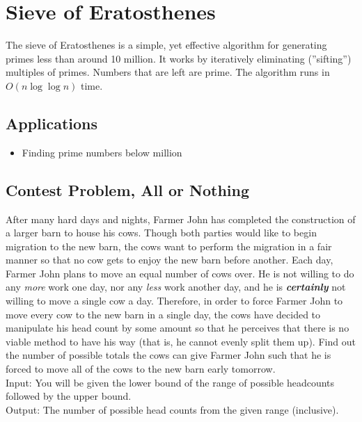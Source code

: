 \section{Sieve of Eratosthenes}
The sieve of Eratosthenes is a simple, yet effective algorithm for generating primes less than around 10 million.
It works by iteratively eliminating (''sifting'') multiples of primes.
Numbers that are left are prime.
The algorithm runs in $O(n\log\log n)$ time.

\subsection{Applications}
\begin{itemize}
	\item	Finding prime numbers below  million
\end{itemize}

\subsection{Contest Problem, All or Nothing}
After many hard days and nights, Farmer John has completed the construction of a larger barn to house his cows.
Though both parties would like to begin migration to the new barn, the cows want to perform the migration in a fair manner so that no cow gets to enjoy the new barn before another.
Each day, Farmer John plans to move an equal number of cows over.
He is not willing to do any \textit{more} work one day, nor any \textit{less} work another day, and he is \textbf{\textit{certainly}} not willing to move a single cow a day.
Therefore, in order to force Farmer John to move every cow to the new barn in a single day, the cows have decided to manipulate his head count by some amount so that he perceives that there is no viable method to have his way (that is, he cannot evenly split them up).
Find out the number of possible totals the cows can give Farmer John such that he is forced to move all of the cows to the new barn early tomorrow.
\\Input: You will be given the lower bound of the range of possible headcounts followed by the upper bound.
\\Output: The number of possible head counts from the given range (inclusive).
